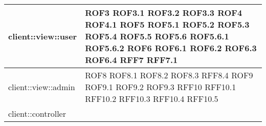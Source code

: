 \begin{center}
\begin{longtable}{| p{9cm} | p{4cm} |}
\hline
client::view::user  &  ROF3 \newline ROF3.1 \newline ROF3.2 \newline ROF3.3 \newline ROF4 \newline ROF4.1 \newline ROF5 \newline ROF5.1 \newline ROF5.2 \newline ROF5.3 \newline ROF5.4 \newline ROF5.5  \newline ROF5.6 \newline ROF5.6.1 \newline ROF5.6.2 \newline ROF6 \newline ROF6.1 \newline ROF6.2 \newline ROF6.3 \newline ROF6.4 \newline RFF7 \newline RFF7.1 \newline \\
\hline
client::view::admin  &  ROF8 \newline ROF8.1 \newline ROF8.2 \newline ROF8.3 \newline RFF8.4 \newline ROF9 \newline ROF9.1 \newline ROF9.2 \newline ROF9.3 \newline RFF10 \newline RFF10.1 \newline RFF10.2 \newline RFF10.3 \newline RFF10.4 \newline RFF10.5 \newline \\
\hline
client::controller  &  \\
\hline

\end{longtable}
\end{center}
